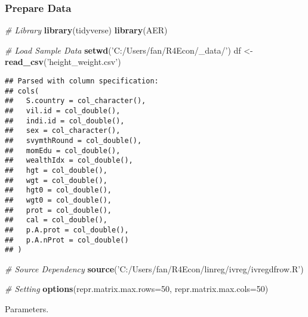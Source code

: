 \documentclass[
]{book}
\newenvironment{Shaded}{\begin{snugshade}}{\end{snugshade}}
\newcommand{\CommentTok}[1]{\textcolor[rgb]{0.56,0.35,0.01}{\textit{#1}}}
\newcommand{\DataTypeTok}[1]{\textcolor[rgb]{0.13,0.29,0.53}{#1}}
\newcommand{\DecValTok}[1]{\textcolor[rgb]{0.00,0.00,0.81}{#1}}
\newcommand{\KeywordTok}[1]{\textcolor[rgb]{0.13,0.29,0.53}{\textbf{#1}}}
\newcommand{\NormalTok}[1]{#1}
\newcommand{\StringTok}[1]{\textcolor[rgb]{0.31,0.60,0.02}{#1}}
\begin{document}
\hypertarget{prepare-data}{%
\subsubsection{Prepare Data}\label{prepare-data}}

\begin{Shaded}
\begin{Highlighting}[]
\CommentTok{# Library}
\KeywordTok{library}\NormalTok{(tidyverse)}
\KeywordTok{library}\NormalTok{(AER)}

\CommentTok{# Load Sample Data}
\KeywordTok{setwd}\NormalTok{(}\StringTok{'C:/Users/fan/R4Econ/_data/'}\NormalTok{)}
\NormalTok{df <-}\StringTok{ }\KeywordTok{read_csv}\NormalTok{(}\StringTok{'height_weight.csv'}\NormalTok{)}
\end{Highlighting}
\end{Shaded}

\begin{verbatim}
## Parsed with column specification:
## cols(
##   S.country = col_character(),
##   vil.id = col_double(),
##   indi.id = col_double(),
##   sex = col_character(),
##   svymthRound = col_double(),
##   momEdu = col_double(),
##   wealthIdx = col_double(),
##   hgt = col_double(),
##   wgt = col_double(),
##   hgt0 = col_double(),
##   wgt0 = col_double(),
##   prot = col_double(),
##   cal = col_double(),
##   p.A.prot = col_double(),
##   p.A.nProt = col_double()
## )
\end{verbatim}

\begin{Shaded}
\begin{Highlighting}[]
\CommentTok{# Source Dependency}
\KeywordTok{source}\NormalTok{(}\StringTok{'C:/Users/fan/R4Econ/linreg/ivreg/ivregdfrow.R'}\NormalTok{)}

\CommentTok{# Setting}
\KeywordTok{options}\NormalTok{(}\DataTypeTok{repr.matrix.max.rows=}\DecValTok{50}\NormalTok{, }\DataTypeTok{repr.matrix.max.cols=}\DecValTok{50}\NormalTok{)}
\end{Highlighting}
\end{Shaded}

Parameters.
\end{document}
